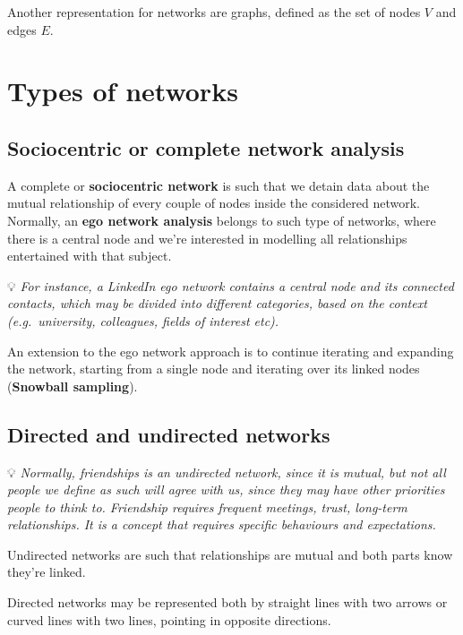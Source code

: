 \documentclass[
  notitlepage,
  onecolumn,
  openany]{book}
\begin{document}
Another representation for networks are graphs, defined as the set of nodes \(V\) and edges \(E\).

\hypertarget{types-of-networks}{%
\section{Types of networks}\label{types-of-networks}}

\hypertarget{sociocentric-or-complete-network-analysis}{%
\subsection{Sociocentric or complete network analysis}\label{sociocentric-or-complete-network-analysis}}

A complete or \textbf{sociocentric network} is such that we detain data about the mutual relationship of every couple of nodes inside the considered network. Normally, an \textbf{ego network analysis} belongs to such type of networks, where there is a central node and we're interested in modelling all relationships entertained with that subject.

💡 \emph{For instance, a LinkedIn ego network contains a central node and its connected contacts, which may be divided into different categories, based on the context (e.g.~university, colleagues, fields of interest etc).}

An extension to the ego network approach is to continue iterating and expanding the network, starting from a single node and iterating over its linked nodes (\textbf{Snowball sampling}).

\hypertarget{directed-and-undirected-networks}{%
\subsection{Directed and undirected networks}\label{directed-and-undirected-networks}}

💡 \emph{Normally, friendships is an undirected network, since it is mutual, but not all people we define as such will agree with us, since they may have other priorities people to think to. Friendship requires frequent meetings, trust, long-term relationships. It is a concept that requires specific behaviours and expectations.}

Undirected networks are such that relationships are mutual and both parts know they're linked.

Directed networks may be represented both by straight lines with two arrows or curved lines with two lines, pointing in opposite directions.
\end{document}
